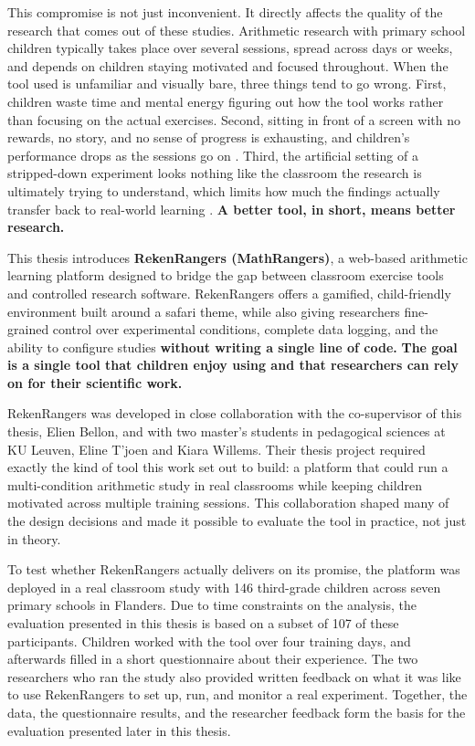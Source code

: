 This compromise is not just inconvenient. It directly affects the quality of the research that comes out of these studies. Arithmetic research with primary school children typically takes place over several sessions, spread across days or weeks, and depends on children staying motivated and focused throughout. When the tool used is unfamiliar and visually bare, three things tend to go wrong. First, children waste time and mental energy figuring out how the tool works rather than focusing on the actual exercises. Second, sitting in front of a screen with no rewards, no story, and no sense of progress is exhausting, and children's performance drops as the sessions go on \cite{sievertsen2016cognitive, hopstaken2015role}. Third, the artificial setting of a stripped-down experiment looks nothing like the classroom the research is ultimately trying to understand, which limits how much the findings actually transfer back to real-world learning \cite{bronfenbrenner1977toward}. \textbf{A better tool, in short, means better research.}

This thesis introduces \textbf{RekenRangers (MathRangers)}, a web-based arithmetic learning platform designed to bridge the gap between classroom exercise tools and controlled research software. RekenRangers offers a gamified, child-friendly environment built around a safari theme, while also giving researchers fine-grained control over experimental conditions, complete data logging, and the ability to configure studies \textbf{without writing a single line of code.} \textbf{The goal is a single tool that children enjoy using and that researchers can rely on for their scientific work.}

RekenRangers was developed in close collaboration with the co-supervisor of this thesis, Elien Bellon, and with two master's students in pedagogical sciences at KU Leuven, Eline T'joen and Kiara Willems. Their thesis project required exactly the kind of tool this work set out to build: a platform that could run a multi-condition arithmetic study in real classrooms while keeping children motivated across multiple training sessions. This collaboration shaped many of the design decisions and made it possible to evaluate the tool in practice, not just in theory.

To test whether RekenRangers actually delivers on its promise, the platform was deployed in a real classroom study with 146 third-grade children across seven primary schools in Flanders. Due to time constraints on the analysis, the evaluation presented in this thesis is based on a subset of 107 of these participants. Children worked with the tool over four training days, and afterwards filled in a short questionnaire about their experience. The two researchers who ran the study also provided written feedback on what it was like to use RekenRangers to set up, run, and monitor a real experiment. Together, the data, the questionnaire results, and the researcher feedback form the basis for the evaluation presented later in this thesis.

